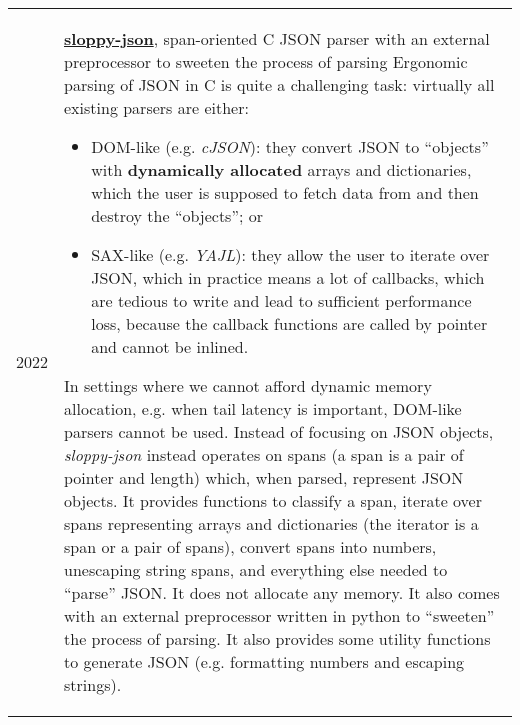 \documentclass[10pt]{article}
\begin{document}
\begin{tabularx}{\textwidth}{ l X }
    2022 & \href{https://github.com/shdown/sloppy-json}{\textbf{sloppy-json}}, span-oriented C JSON parser with an external preprocessor to sweeten the process of parsing
    \newline
    Ergonomic parsing of JSON in C is quite a challenging task: virtually all existing parsers are either:
    \begin{itemize}
        \item DOM-like (e.g. \textit{cJSON}): they convert JSON to ``objects'' with \textbf{dynamically allocated} arrays and dictionaries, which the user is supposed to fetch data from and then destroy the ``objects''; or
        \item SAX-like (e.g. \textit{YAJL}): they allow the user to iterate over JSON, which in practice means a lot of callbacks, which are tedious to write and lead to sufficient performance loss, because the callback functions are called by pointer and cannot be inlined.
    \end{itemize}
    In settings where we cannot afford dynamic memory allocation, e.g. when tail latency is important, DOM-like parsers cannot be used.
    Instead of focusing on JSON objects, \textit{sloppy-json} instead operates on spans (a span is a pair of pointer and length) which, when parsed, represent JSON objects.
    It provides functions to classify a span, iterate over spans representing arrays and dictionaries (the iterator is a span or a pair of spans), convert spans into numbers, unescaping string spans, and everything else needed to ``parse'' JSON.
    It does not allocate any memory.
    It also comes with an external preprocessor written in python to ``sweeten'' the process of parsing.
    It also provides some utility functions to generate JSON (e.g. formatting numbers and escaping strings).
    \\
\end{tabularx}
\end{document}

